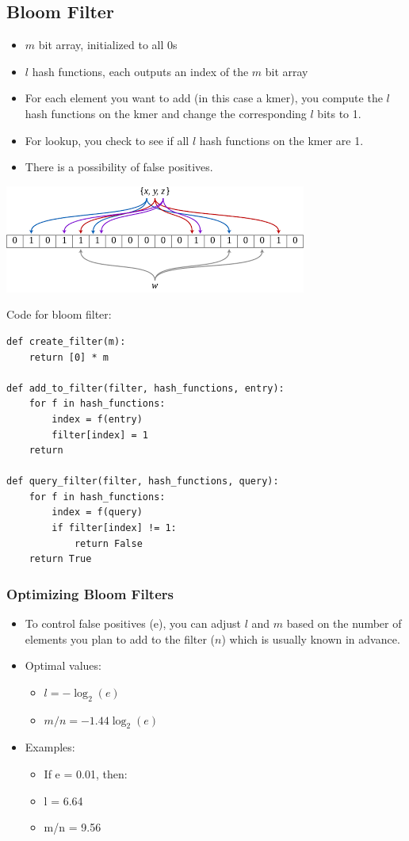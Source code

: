 \documentclass[10pt]{article}
\begin{document}
\subsection*{Bloom Filter}
\begin{itemize}
    \item $m$ bit array, initialized to all 0s
    \item $l$ hash functions, each outputs an index of the $m$ bit array
    \item For each element you want to add (in this case a kmer), you compute the $l$ hash functions on the kmer and change the corresponding $l$ bits to 1.
    \item For lookup, you check to see if all $l$ hash functions on the kmer are 1.
    \item There is a possibility of false positives.
\end{itemize}
\begin{center}
    \includegraphics*[scale=0.7]{W2_3.png}
\end{center}
Code for bloom filter:
\begin{verbatim}
def create_filter(m):
    return [0] * m

def add_to_filter(filter, hash_functions, entry):
    for f in hash_functions:
        index = f(entry)
        filter[index] = 1
    return

def query_filter(filter, hash_functions, query):
    for f in hash_functions:
        index = f(query)
        if filter[index] != 1:
            return False
    return True
\end{verbatim}

\subsubsection*{Optimizing Bloom Filters}
\begin{itemize}
    \item To control false positives (e), you can adjust $l$ and $m$ based on the number of elements you plan to add to the filter ($n$) which is usually known in advance.
    \item Optimal values:
    \begin{itemize}
        \item $l = -\log_2(e)$
        \item $m / n = -1.44 \log_2(e)$
    \end{itemize}
    \item Examples:
    \begin{itemize}
        \item If e = 0.01, then:
        \item l = 6.64
        \item m/n = 9.56
    \end{itemize}
\end{itemize}
\end{document}
